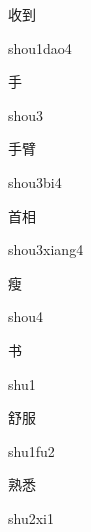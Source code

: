 \begin{multicols*}{2}
\begin{verbete}{收到}
\begin{pronuncia}{shou1dao4}
\end{pronuncia}
\end{verbete}

\begin{verbete}[shou3]{手}
\begin{pronuncia}{shou3}
\end{pronuncia}
\end{verbete}

\begin{verbete}[shou3bi4]{手臂}
\begin{pronuncia}{shou3bi4}
\end{pronuncia}
\end{verbete}

\begin{verbete}{首相}
\begin{pronuncia}{shou3xiang4}
\end{pronuncia}
\end{verbete}

\begin{verbete}[shou4]{瘦}
\begin{pronuncia}{shou4}
\end{pronuncia}
\end{verbete}

\begin{verbete}[shu1]{书}
\begin{pronuncia}{shu1}
\end{pronuncia}
\end{verbete}

\begin{verbete}[shu1fu2]{舒服}
\begin{pronuncia}{shu1fu2}
\end{pronuncia}
\end{verbete}

\begin{verbete}[shu2xi1]{熟悉}
\begin{pronuncia}{shu2xi1}
\end{pronuncia}
\end{verbete}


\end{multicols*}
